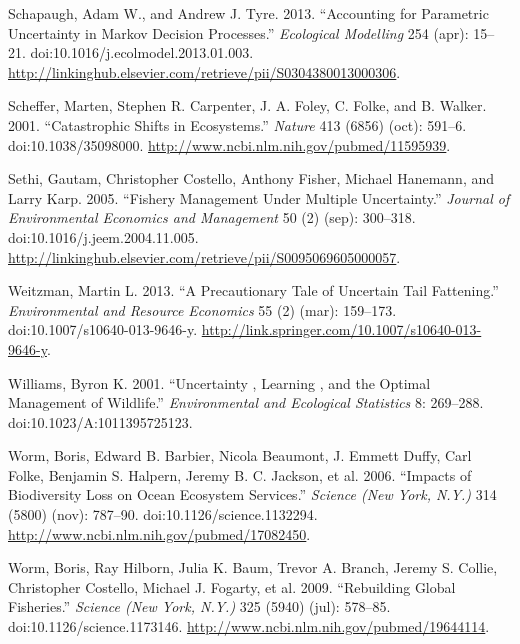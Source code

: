 \documentclass[author-year, review]{elsarticle} %
\begin{document}
Schapaugh, Adam W., and Andrew J. Tyre. 2013. ``Accounting for
Parametric Uncertainty in Markov Decision Processes.'' \emph{Ecological
Modelling} 254 (apr): 15--21. doi:10.1016/j.ecolmodel.2013.01.003.
\url{http://linkinghub.elsevier.com/retrieve/pii/S0304380013000306}.

Scheffer, Marten, Stephen R. Carpenter, J. A. Foley, C. Folke, and B.
Walker. 2001. ``Catastrophic Shifts in Ecosystems.'' \emph{Nature} 413
(6856) (oct): 591--6. doi:10.1038/35098000.
\url{http://www.ncbi.nlm.nih.gov/pubmed/11595939}.

Sethi, Gautam, Christopher Costello, Anthony Fisher, Michael Hanemann,
and Larry Karp. 2005. ``Fishery Management Under Multiple Uncertainty.''
\emph{Journal of Environmental Economics and Management} 50 (2) (sep):
300--318. doi:10.1016/j.jeem.2004.11.005.
\url{http://linkinghub.elsevier.com/retrieve/pii/S0095069605000057}.

Weitzman, Martin L. 2013. ``A Precautionary Tale of Uncertain Tail
Fattening.'' \emph{Environmental and Resource Economics} 55 (2) (mar):
159--173. doi:10.1007/s10640-013-9646-y.
\url{http://link.springer.com/10.1007/s10640-013-9646-y}.

Williams, Byron K. 2001. ``Uncertainty , Learning , and the Optimal
Management of Wildlife.'' \emph{Environmental and Ecological Statistics}
8: 269--288. doi:10.1023/A:1011395725123.

Worm, Boris, Edward B. Barbier, Nicola Beaumont, J. Emmett Duffy, Carl
Folke, Benjamin S. Halpern, Jeremy B. C. Jackson, et al. 2006. ``Impacts
of Biodiversity Loss on Ocean Ecosystem Services.'' \emph{Science (New
York, N.Y.)} 314 (5800) (nov): 787--90. doi:10.1126/science.1132294.
\url{http://www.ncbi.nlm.nih.gov/pubmed/17082450}.

Worm, Boris, Ray Hilborn, Julia K. Baum, Trevor A. Branch, Jeremy S.
Collie, Christopher Costello, Michael J. Fogarty, et al. 2009.
``Rebuilding Global Fisheries.'' \emph{Science (New York, N.Y.)} 325
(5940) (jul): 578--85. doi:10.1126/science.1173146.
\url{http://www.ncbi.nlm.nih.gov/pubmed/19644114}.
\end{document}
